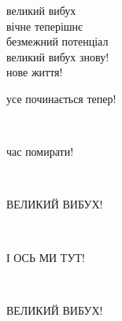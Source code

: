 великий вибух\\
вічне теперішнє\\
безмежний потенціал\\
великий вибух знову!\\
нове життя!\\
\begin{large}усе починається тепер!\end{large}\\
\begin{large}час помирати!\end{large}\\
\begin{large}ВЕЛИКИЙ ВИБУХ!\end{large}\\
\begin{large}І ОСЬ МИ ТУТ!\end{large}\\
\begin{Large}ВЕЛИКИЙ ВИБУХ!\end{Large}
